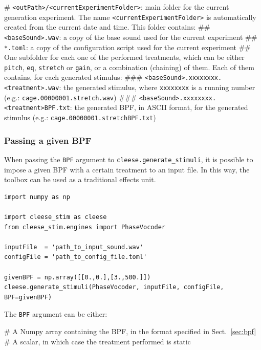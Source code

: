 \documentclass[oneside,10pt]{article}
\newcommand{\mip}{\texttt}
\begin{document}
\begin{sloppypar}
\vspace{5pt}
\begin{easylist}[itemize]
# \texttt{<outPath>/<currentExperimentFolder>}: main folder for the current
        generation experiment. The name \texttt{<currentExperimentFolder>} is
        automatically created from the current date and time. This folder
        contains:
## \texttt{<baseSound>.wav}: a copy of the base sound used for the current experiment
## \texttt{*.toml}: a copy of the configuration script used for the current experiment
## One subfolder for each one of the performed treatments, which can be either
        \texttt{pitch},  \texttt{eq}, \texttt{stretch} or \texttt{gain}, or a
        combination (chaining) of them. Each of them contains, for each
        generated stimulus:
### \texttt{<baseSound>.xxxxxxxx.<treatment>.wav}: the generated stimulus, where
        \texttt{xxxxxxxx} is a running number (e.g.: \texttt{cage.00000001.stretch.wav})
### \texttt{<baseSound>.xxxxxxxx.<treatment>BPF.txt}: the generated BPF, in ASCII
        format, for the generated stimulus (e.g.: \texttt{cage.00000001.stretchBPF.txt})
\end{easylist}
\vspace{8pt}
\end{sloppypar}

\subsubsection{Passing a given BPF}

When passing the \texttt{BPF} argument to \texttt{cleese.generate\_stimuli}, it
is possible to impose a given BPF with a certain treatment to an input file. In
this way, the toolbox can be used as a traditional effects unit.

\vspace{8pt}
\begin{verbatim}
import numpy as np

import cleese_stim as cleese
from cleese_stim.engines import PhaseVocoder

inputFile  = 'path_to_input_sound.wav'
configFile = 'path_to_config_file.toml'

givenBPF = np.array([[0.,0.],[3.,500.]])
cleese.generate_stimuli(PhaseVocoder, inputFile, configFile, BPF=givenBPF)
\end{verbatim}
\vspace{8pt}

The \mip{BPF} argument can be either:
\vspace{5pt}
\begin{easylist}[itemize]
# A Numpy array containing the BPF, in the format specified in Sect.~\ref{sec:bpf}
# A scalar, in which case the treatment performed is static
\end{easylist}
\vspace{8pt}
\end{document}
